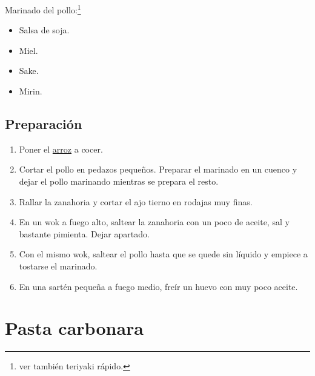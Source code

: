 \documentclass[
]{book}
\providecommand{\tightlist}{%
  \setlength{\itemsep}{0pt}\setlength{\parskip}{0pt}}
\begin{document}
Marinado del pollo:\footnote{ver también teriyaki rápido.}

\begin{itemize}
\tightlist
\item
  Salsa de soja.
\item
  Miel.
\item
  Sake.
\item
  Mirin.
\end{itemize}

\hypertarget{preparaciuxf3n}{%
\section*{Preparación}\label{preparaciuxf3n}}

\begin{enumerate}
\def\labelenumi{\arabic{enumi}.}
\tightlist
\item
  Poner el \url{arroz} a cocer.
\item
  Cortar el pollo en pedazos pequeños. Preparar el marinado en un cuenco y dejar el pollo marinando mientras se prepara el resto.
\item
  Rallar la zanahoria y cortar el ajo tierno en rodajas muy finas.
\item
  En un wok a fuego alto, saltear la zanahoria con un poco de aceite, sal y bastante pimienta. Dejar apartado.
\item
  Con el mismo wok, saltear el pollo hasta que se quede sin líquido y empiece a tostarse el marinado.
\item
  En una sartén pequeña a fuego medio, freír un huevo con muy poco aceite.
\end{enumerate}

\hypertarget{pasta-carbonara}{%
\chapter{Pasta carbonara}\label{pasta-carbonara}}
\end{document}
